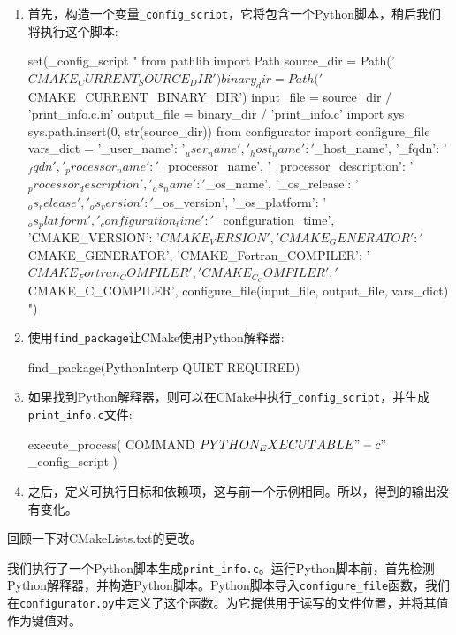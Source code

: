 \begin{enumerate}
\item 首先，构造一个变量\texttt{\_config\_script}，它将包含一个Python脚本，稍后我们将执行这个脚本:

\begin{codebox}[cmake]
set(_config_script
"
from pathlib import Path
source_dir = Path('${CMAKE_CURRENT_SOURCE_DIR}')
binary_dir = Path('${CMAKE_CURRENT_BINARY_DIR}')
input_file = source_dir / 'print_info.c.in'
output_file = binary_dir / 'print_info.c'
import sys
sys.path.insert(0, str(source_dir))
from configurator import configure_file
vars_dict = {
  '_user_name': '${_user_name}',
  '_host_name': '${_host_name}',
  '_fqdn': '${_fqdn}',
  '_processor_name': '${_processor_name}',
  '_processor_description': '${_processor_description}',
  '_os_name': '${_os_name}',
  '_os_release': '${_os_release}',
  '_os_version': '${_os_version}',
  '_os_platform': '${_os_platform}',
  '_configuration_time': '${_configuration_time}',
  'CMAKE_VERSION': '${CMAKE_VERSION}',
  'CMAKE_GENERATOR': '${CMAKE_GENERATOR}',
  'CMAKE_Fortran_COMPILER': '${CMAKE_Fortran_COMPILER}',
  'CMAKE_C_COMPILER': '${CMAKE_C_COMPILER}',
}
configure_file(input_file, output_file, vars_dict)
")
\end{codebox}

\item 使用\texttt{find\_package}让CMake使用Python解释器:

\begin{codebox}[cmake]
find_package(PythonInterp QUIET REQUIRED)
\end{codebox}

\item 如果找到Python解释器，则可以在CMake中执行\texttt{\_config\_script}，并生成\texttt{print\_info.c}文件:

\begin{codebox}[cmake]
execute_process(
  COMMAND
    ${PYTHON_EXECUTABLE} "-c" ${_config_script}
  )
\end{codebox}

\item 之后，定义可执行目标和依赖项，这与前一个示例相同。所以，得到的输出没有变化。

\end{enumerate}


回顾一下对CMakeLists.txt的更改。

我们执行了一个Python脚本生成\texttt{print\_info.c}。运行Python脚本前，首先检测Python解释器，并构造Python脚本。Python脚本导入\texttt{configure\_file}函数，我们在\texttt{configurator.py}中定义了这个函数。为它提供用于读写的文件位置，并将其值作为键值对。

